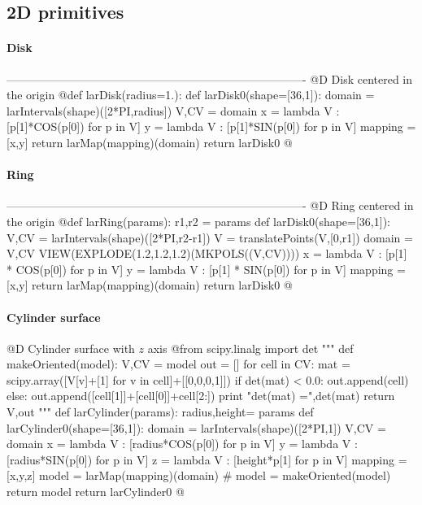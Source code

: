 \documentclass[11pt,oneside]{article}	%
\begin{document}
\subsection{2D primitives}

\paragraph{Disk}
-------------------------------------------------------------------------------
@D Disk centered in the origin
@{def larDisk(radius=1.):
	def larDisk0(shape=[36,1]):
		domain = larIntervals(shape)([2*PI,radius])
		V,CV = domain
		x = lambda V : [p[1]*COS(p[0]) for p in V]
		y = lambda V : [p[1]*SIN(p[0]) for p in V]
		mapping = [x,y]
		return larMap(mapping)(domain)
	return larDisk0
@}

\paragraph{Ring}
-------------------------------------------------------------------------------
@D Ring centered in the origin
@{def larRing(params):
	r1,r2 = params
	def larDisk0(shape=[36,1]):
		V,CV = larIntervals(shape)([2*PI,r2-r1])
		V = translatePoints(V,[0,r1])
		domain = V,CV
		VIEW(EXPLODE(1.2,1.2,1.2)(MKPOLS((V,CV))))
		x = lambda V : [p[1] * COS(p[0]) for p in V]
		y = lambda V : [p[1] * SIN(p[0]) for p in V]
		mapping = [x,y]
		return larMap(mapping)(domain)
	return larDisk0
@}
\paragraph{Cylinder surface}
@D Cylinder surface with $z$ axis
@{from scipy.linalg import det
"""
def makeOriented(model):
	V,CV = model
	out = []
	for cell in CV: 
		mat = scipy.array([V[v]+[1] for v in cell]+[[0,0,0,1]])
		if det(mat) < 0.0:
			out.append(cell)
		else:
			out.append([cell[1]]+[cell[0]]+cell[2:])
		print "\n det(mat) =",det(mat)
	return V,out
"""
def larCylinder(params):
	radius,height= params
	def larCylinder0(shape=[36,1]):
		domain = larIntervals(shape)([2*PI,1])
		V,CV = domain
		x = lambda V : [radius*COS(p[0]) for p in V]
		y = lambda V : [radius*SIN(p[0]) for p in V]
		z = lambda V : [height*p[1] for p in V]
		mapping = [x,y,z]
		model = larMap(mapping)(domain)
		# model = makeOriented(model)
		return model
	return larCylinder0
@}
\end{document}
